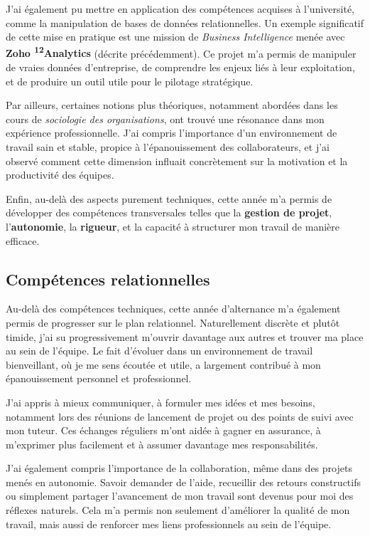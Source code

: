 J’ai également pu mettre en application des compétences acquises à l’université, comme la manipulation de bases de données relationnelles. Un exemple significatif de cette mise en pratique est une mission de \textit{Business Intelligence} menée avec \textbf{ Zoho \textsuperscript{12}Analytics} (décrite précédemment). Ce projet m’a permis de manipuler de vraies données d’entreprise, de comprendre les enjeux liés à leur exploitation, et de produire un outil utile pour le pilotage stratégique.

Par ailleurs, certaines notions plus théoriques, notamment abordées dans les cours de \textit{sociologie des organisations}, ont trouvé une résonance dans mon expérience professionnelle. J’ai compris l’importance d’un environnement de travail sain et stable, propice à l’épanouissement des collaborateurs, et j’ai observé comment cette dimension influait concrètement sur la motivation et la productivité des équipes.

Enfin, au-delà des aspects purement techniques, cette année m’a permis de développer des compétences transversales telles que la \textbf{gestion de projet}, l’\textbf{autonomie}, la \textbf{rigueur}, et la capacité à structurer mon travail de manière efficace.

\subsection{Compétences relationnelles}

Au-delà des compétences techniques, cette année d’alternance m’a également permis de progresser sur le plan relationnel. Naturellement discrète et plutôt timide, j’ai su progressivement m’ouvrir davantage aux autres et trouver ma place au sein de l’équipe. Le fait d’évoluer dans un environnement de travail bienveillant, où je me sens écoutée et utile, a largement contribué à mon épanouissement personnel et professionnel.

J’ai appris à mieux communiquer, à formuler mes idées et mes besoins, notamment lors des réunions de lancement de projet ou des points de suivi avec mon tuteur. Ces échanges réguliers m’ont aidée à gagner en assurance, à m’exprimer plus facilement et à assumer davantage mes responsabilités.

J’ai également compris l’importance de la collaboration, même dans des projets menés en autonomie. Savoir demander de l’aide, recueillir des retours constructifs ou simplement partager l’avancement de mon travail sont devenus pour moi des réflexes naturels. Cela m’a permis non seulement d’améliorer la qualité de mon travail, mais aussi de renforcer mes liens professionnels au sein de l’équipe.

